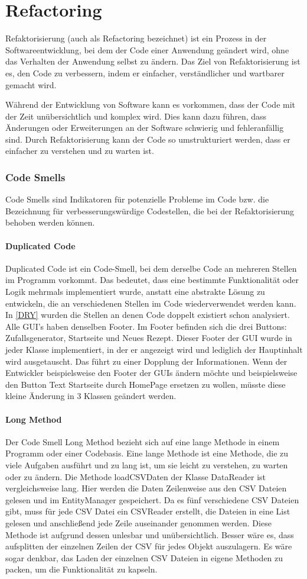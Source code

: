 \chapter{Refactoring}
Refaktorisierung (auch als Refactoring bezeichnet) ist ein Prozess in der Softwareentwicklung, bei dem der Code einer Anwendung geändert wird, ohne das Verhalten der Anwendung selbst zu ändern. Das Ziel von Refaktorisierung ist es, den Code zu verbessern, indem er einfacher, verständlicher und wartbarer gemacht wird.

Während der Entwicklung von Software kann es vorkommen, dass der Code mit der Zeit unübersichtlich und komplex wird. Dies kann dazu führen, dass Änderungen oder Erweiterungen an der Software schwierig und fehleranfällig sind. Durch Refaktorisierung kann der Code so umstrukturiert werden, dass er einfacher zu verstehen und zu warten ist.
\subsection{Code Smells}
Code Smells sind Indikatoren für potenzielle Probleme im Code bzw. die Bezeichnung für verbesserungswürdige Codestellen, die bei der Refaktorisierung behoben werden können. 
\subsubsection{Duplicated Code}
Duplicated Code ist ein Code-Smell, bei dem derselbe Code an mehreren Stellen im Programm vorkommt. Das bedeutet, dass eine bestimmte Funktionalität oder Logik mehrmals implementiert wurde, anstatt eine abstrakte Lösung zu entwickeln, die an verschiedenen Stellen im Code wiederverwendet werden kann. In \autoref{DRY} wurden die Stellen an denen Code doppelt existiert schon analysiert. Alle GUI's haben denselben Footer. Im Footer befinden sich die drei Buttons: Zufallsgenerator, Startseite und Neues Rezept. Dieser Footer der GUI wurde in jeder Klasse implementiert, in der er angezeigt wird und lediglich der Hauptinhalt wird ausgetauscht. Das führt zu einer Dopplung der Informationen. Wenn der Entwickler beispielsweise den Footer der GUIs ändern möchte und beispielsweise den Button Text Startseite durch HomePage ersetzen zu wollen, müsste diese kleine Änderung in 3 Klassen geändert werden. 
\subsubsection{Long Method}
Der Code Smell Long Method bezieht sich auf eine lange Methode in einem Programm oder einer Codebasis. Eine lange Methode ist eine Methode, die zu viele Aufgaben ausführt und zu lang ist, um sie leicht zu verstehen, zu warten oder zu ändern. 
Die Methode loadCSVDaten der Klasse DataReader ist vergleichsweise lang. Hier werden die Daten Zeilenweise aus den CSV Dateien gelesen und im EntityManager gespeichert.
Da es fünf verschiedene CSV Dateien gibt, muss für jede CSV Datei ein CSVReader erstellt, die Dateien in eine List gelesen und anschließend jede Zeile auseinander genommen werden. Diese Methode ist aufgrund dessen unlesbar und unübersichtlich. Besser wäre es, dass aufsplitten der einzelnen Zeilen der CSV für jedes Objekt auszulagern. Es wäre sogar denkbar, das Laden der einzelnen CSV Dateien in eigene Methoden zu packen, um die Funktionalität zu kapseln.
